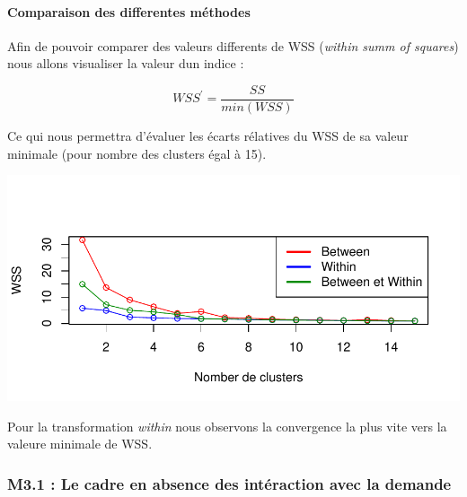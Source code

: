 \documentclass[11pt,]{article}
\let\oldparagraph\paragraph
\renewcommand{\paragraph}[1]{\oldparagraph{#1}\mbox{}}
\begin{document}
\hypertarget{comparaison-des-differentes-methodes}{%
\paragraph{Comparaison des differentes
méthodes}\label{comparaison-des-differentes-methodes}}

Afin de pouvoir comparer des valeurs differents de WSS (\emph{within
summ of squares}) nous allons visualiser la valeur dun indice :

\begin{equation*}
    WSS^{'} = \frac{SS}{min(WSS)}
\end{equation*}

Ce qui nous permettra d'évaluer les écarts rélatives du WSS de sa valeur
minimale (pour nombre des clusters égal à 15).

\FloatBarrier

\begin{center}\includegraphics{note2pres_files/figure-latex/unnamed-chunk-41-1} \end{center}

\FloatBarrier

Pour la transformation \emph{within} nous observons la convergence la
plus vite vers la valeure minimale de WSS.

\hypertarget{m3.1-le-cadre-en-absence-des-interaction-avec-la-demande}{%
\subsubsection{M3.1 : Le cadre en absence des intéraction avec la
demande}\label{m3.1-le-cadre-en-absence-des-interaction-avec-la-demande}}

\FloatBarrier
\end{document}
